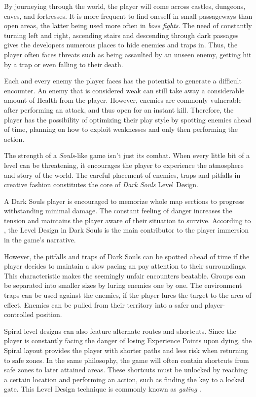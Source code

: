 By journeying through the world, the player will come across castles, dungeons, caves, and fortresses. It is more frequent to find oneself in small passageways than open areas, the latter being used more often in \emph{boss fights}. The need of constantly turning left and right, ascending stairs and descending through dark passages gives the developers numerous places to hide enemies and traps in. Thus, the player often faces threats such as being assaulted by an unseen enemy, getting hit by a trap or even falling to their death.

Each and every enemy the player faces has the potential to generate a difficult encounter. An enemy that is considered weak can still take away a considerable amount of Health from the player. However, enemies are commonly vulnerable after performing an attack, and thus open for an instant kill. Therefore, the player has the possibility of optimizing their play style by spotting enemies ahead of time, planning on how to exploit weaknesses and only then performing the action.

The strength of a \emph{Souls}-like game isn't just its combat. When every little bit of a level can be threatening, it encourages the player to experience the atmosphere and story of the world. The careful placement of enemies, traps and pitfalls in creative fashion constitutes the core of \emph{Dark Souls} Level Design.

A Dark Souls player is encouraged to memorize whole map sections to progress withstanding minimal damage. The constant feeling of danger increases the tension and maintains the player aware of their situation to survive. According to , the Level Design in  Dark Souls is the main contributor to the player immersion in the game's narrative.

However, the pitfalls and traps of Dark Souls can be spotted ahead of time if the player decides to maintain a slow pacing an pay attention to their surroundings. This characteristic makes the seemingly unfair encounters beatable. Groups can be separated into smaller sizes by luring enemies one by one. The environment traps can be used against the enemies, if the player lures the target to the area of effect. Enemies can be pulled from their territory into a safer and player-controlled position.

Spiral level designs can also feature alternate routes and shortcuts. Since the player is constantly facing the danger of losing Experience Points upon dying, the Spiral layout provides the player with shorter paths and less risk when returning to safe zones. In the same philosophy, the game will often contain shortcuts from safe zones to later attained areas. These shortcuts must be unlocked by reaching a certain location and performing an action, such as finding the key to a locked gate. This Level Design technique is commonly known as \emph{gating} \cite{BOOK_LevelUpTheGuideToGreat}.

